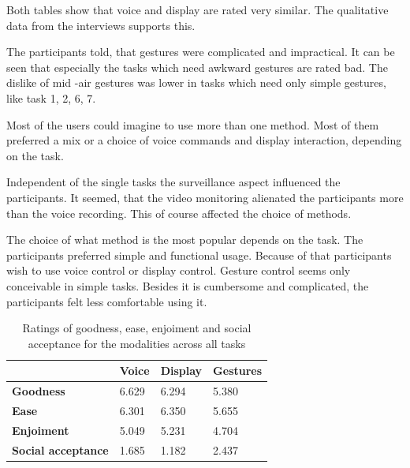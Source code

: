 \documentclass[sigchi]{acmart}
\begin{document}
	Both tables show that voice and display are rated very similar. The qualitative data from the interviews supports this. 
	
	The participants told, that gestures were complicated and impractical. It can be seen that especially the tasks which need awkward gestures are rated bad. The dislike of mid -air gestures was lower in tasks which need only simple gestures, like task 1, 2, 6, 7. 
	
	Most of the users could imagine to use more than one method. Most of them preferred a mix or a choice of voice commands and display interaction, depending on the task.
	
	Independent of the single tasks the surveillance aspect influenced the participants. It seemed, that the video monitoring alienated the participants more than the voice recording. This of course affected the choice of methods.
	
	The choice of what method is the most popular depends on the task. The participants preferred simple and functional usage. Because of that participants wish to use voice control or display control. Gesture control seems only conceivable in simple tasks. Besides it is cumbersome and complicated, the participants felt less comfortable using it. 
	\begin{table}[h]
		\begin{center}
			\caption{Ratings of goodness, ease, enjoiment and social acceptance for the modalities across all tasks}
			\label{tab:AllModalitiesGEES}
			\begin{footnotesize}				
				\begin{tabular}{p{} R{0.15\columnwidth} R{0.15\columnwidth} R{0.15\columnwidth}} \toprule
												& \textbf{Voice}	& \textbf{Display}	& \textbf{Gestures} \\ \midrule
					\textbf{Goodness}			& 6.629				& 6.294 			& 5.380 \\ \midrule
					\textbf{Ease}				& 6.301				& 6.350 			& 5.655 \\ \midrule
					\textbf{Enjoiment}			& 5.049				& 5.231 			& 4.704 \\ \midrule
					\textbf{Social acceptance}	& 1.685				& 1.182				& 2.437 \\ \bottomrule
				\end{tabular}
			\end{footnotesize}	
		\end{center}
	\end{table}
\end{document}
